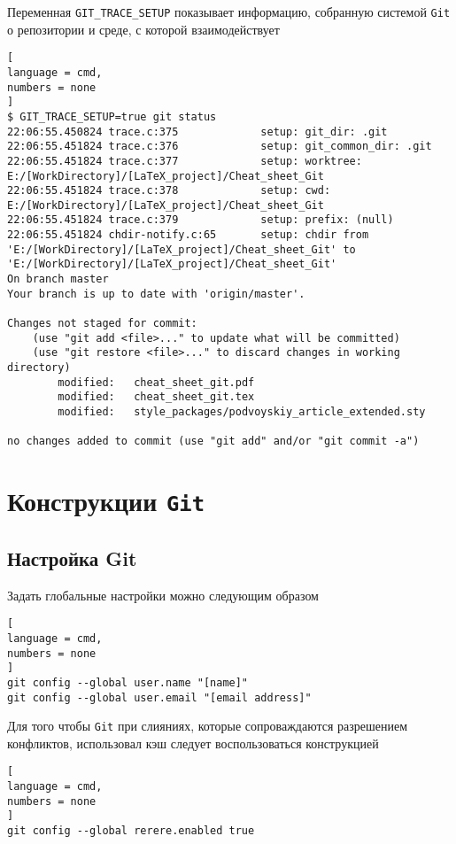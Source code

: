 \documentclass[%
	11pt,
	a4paper,
	utf8,
		]{article}
\begin{document}
Переменная \verb|GIT_TRACE_SETUP| показывает информацию, собранную системой \texttt{Git} о репозитории и среде, с которой взаимодействует
\begin{lstlisting}[
language = cmd,
numbers = none
]
$ GIT_TRACE_SETUP=true git status
22:06:55.450824 trace.c:375             setup: git_dir: .git
22:06:55.451824 trace.c:376             setup: git_common_dir: .git
22:06:55.451824 trace.c:377             setup: worktree: E:/[WorkDirectory]/[LaTeX_project]/Cheat_sheet_Git
22:06:55.451824 trace.c:378             setup: cwd: E:/[WorkDirectory]/[LaTeX_project]/Cheat_sheet_Git
22:06:55.451824 trace.c:379             setup: prefix: (null)
22:06:55.451824 chdir-notify.c:65       setup: chdir from 'E:/[WorkDirectory]/[LaTeX_project]/Cheat_sheet_Git' to 'E:/[WorkDirectory]/[LaTeX_project]/Cheat_sheet_Git'
On branch master
Your branch is up to date with 'origin/master'.

Changes not staged for commit:
    (use "git add <file>..." to update what will be committed)
    (use "git restore <file>..." to discard changes in working directory)
        modified:   cheat_sheet_git.pdf
        modified:   cheat_sheet_git.tex
        modified:   style_packages/podvoyskiy_article_extended.sty

no changes added to commit (use "git add" and/or "git commit -a")
\end{lstlisting}


\section{Конструкции \texttt{Git}}

\subsection{Настройка Git}

Задать глобальные настройки можно следующим образом

\begin{lstlisting}[
language = cmd,
numbers = none
]
git config --global user.name "[name]"
git config --global user.email "[email address]"
\end{lstlisting}

Для того чтобы \texttt{Git} при слияниях, которые сопроваждаются разрешением конфликтов, использовал кэш следует воспользоваться конструкцией

\begin{lstlisting}[
language = cmd,
numbers = none
]
git config --global rerere.enabled true
\end{lstlisting}
\end{document}
